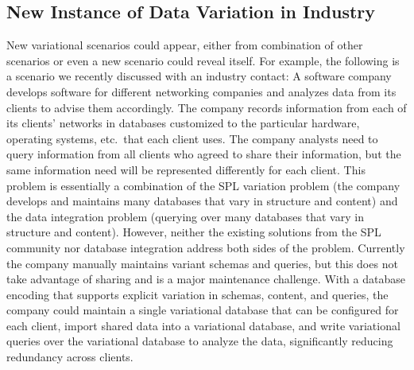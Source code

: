 \subsection{New Instance of Data Variation in Industry}
\label{sec:industryex}



New variational scenarios could appear, either from combination of other scenarios
or even a new scenario could reveal itself. For example, the following is
a scenario we recently discussed with an industry contact:
%
A software company develops software for different networking companies and
analyzes data from its clients to advise them accordingly. 
%
The company records information from each of its clients' networks in databases
customized to the particular hardware, operating systems, etc.\ that each
client uses.
%
The company analysts need to query information from all clients who agreed to
share their information, but the same information need will be represented
differently for each client.
%
This problem is essentially a combination of the SPL variation problem (the
company develops and maintains many databases that vary in structure and
content) and the data integration problem (querying over many databases that
vary in structure and content). However, neither the existing solutions from
the SPL community nor database integration address both sides of the problem.
%
Currently the company manually maintains variant schemas and queries, but this
does not take advantage of sharing and is a major maintenance challenge.
%
With a database encoding that supports explicit variation in schemas, content,
and queries, the company could maintain a single variational database that can
be configured for each client, import shared data into a variational database, and write
variational queries over the variational database to analyze the data, significantly reducing redundancy
across clients.
